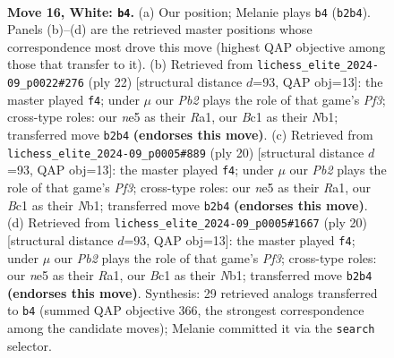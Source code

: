 \documentclass[11pt]{article}
\begin{document}
\clearpage

\begin{figure}[p]\centering
\begin{subfigure}{0.46\textwidth}\centering
\resizebox{\linewidth}{!}{%
\newchessgame
\chessboard[
  setfen={r2q4/1bp1k1pp/1b1p1n2/pp2n3/4P3/2P5/PPQ2PPP/RNB1RK2 w - - 2 16},
  showmover=false,
  pgfstyle=straightmove, color=movearrow, markmove={b2-b4}
]}
\caption{}
\end{subfigure}\hfill
\begin{subfigure}{0.46\textwidth}\centering
\resizebox{\linewidth}{!}{%
\newchessgame
\chessboard[
  setfen={r2qkb1r/ppp2ppp/n7/4p3/1P1nP3/P2P1P2/1B3P1P/RN1QKB1R w KQkq - 1 12},
  showmover=false,
  pgfstyle=straightmove, color=movearrow, markmove={f3-f4}
]}
\caption{}
\end{subfigure}
\\[4pt]
\begin{subfigure}{0.46\textwidth}\centering
\resizebox{\linewidth}{!}{%
\newchessgame
\chessboard[
  setfen={r2qkb1r/ppp2ppp/n7/4p3/1P1nP3/P2P1P2/1B3P1P/RN1QKB1R w KQkq - 1 11},
  showmover=false,
  pgfstyle=straightmove, color=movearrow, markmove={f3-f4}
]}
\caption{}
\end{subfigure}\hfill
\begin{subfigure}{0.46\textwidth}\centering
\resizebox{\linewidth}{!}{%
\newchessgame
\chessboard[
  setfen={r2qkb1r/ppp2ppp/n7/4p3/1P1nP3/P2P1P2/1B3P1P/RN1QKB1R w KQkq - 1 11},
  showmover=false,
  pgfstyle=straightmove, color=movearrow, markmove={f3-f4}
]}
\caption{}
\end{subfigure}
\caption{\textbf{Move 16, White: \texttt{b4}.} (a) Our position; Melanie plays \texttt{b4} (\texttt{b2b4}). Panels (b)--(d) are the retrieved master positions whose correspondence most drove this move (highest QAP objective among those that transfer to it). (b) Retrieved from \texttt{lichess\_elite\_2024-09\_p0022\#276} (ply 22) [structural distance $d$=93, QAP obj=13]: the master played \texttt{f4}; under $\mu$ our \emph{Pb2} plays the role of that game's \emph{Pf3}; cross-type roles: our \emph{n}e5 as their \emph{R}a1, our \emph{B}c1 as their \emph{N}b1; transferred move \texttt{b2b4} \textbf{(endorses this move)}. (c) Retrieved from \texttt{lichess\_elite\_2024-09\_p0005\#889} (ply 20) [structural distance $d$=93, QAP obj=13]: the master played \texttt{f4}; under $\mu$ our \emph{Pb2} plays the role of that game's \emph{Pf3}; cross-type roles: our \emph{n}e5 as their \emph{R}a1, our \emph{B}c1 as their \emph{N}b1; transferred move \texttt{b2b4} \textbf{(endorses this move)}. (d) Retrieved from \texttt{lichess\_elite\_2024-09\_p0005\#1667} (ply 20) [structural distance $d$=93, QAP obj=13]: the master played \texttt{f4}; under $\mu$ our \emph{Pb2} plays the role of that game's \emph{Pf3}; cross-type roles: our \emph{n}e5 as their \emph{R}a1, our \emph{B}c1 as their \emph{N}b1; transferred move \texttt{b2b4} \textbf{(endorses this move)}. Synthesis: 29 retrieved analogs transferred to \texttt{b4} (summed QAP objective 366, the strongest correspondence among the candidate moves); Melanie committed it via the \texttt{search} selector.}
\label{fig:thought-m30}
\end{figure}
\end{document}
